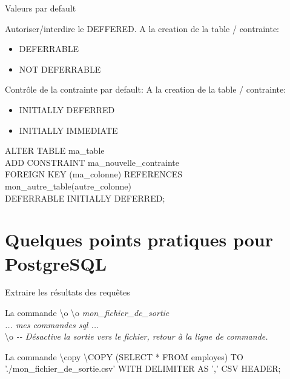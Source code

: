 \documentclass[dvipsnames]{beamer}
\begin{document}
\begin{frame}{Valeurs par default}
	\begin{block}{Autoriser/interdire le DEFFERED.}
	A la creation de la table / contrainte:
		\begin{itemize}
			\item DEFERRABLE
			\item NOT DEFERRABLE
		\end{itemize}
	\end{block}
	
	\begin{block}{Contrôle de la contrainte par default:}
	A la creation de la table / contrainte:
		\begin{itemize}
			\item INITIALLY DEFERRED
			\item INITIALLY IMMEDIATE
		\end{itemize}
	\end{block}

	\begin{alertblock}{}
{\scriptsize ALTER TABLE ma\_table\\ ADD CONSTRAINT ma\_nouvelle\_contrainte\\ FOREIGN KEY (ma\_colonne) REFERENCES mon\_autre\_table(autre\_colonne)\\ DEFERRABLE INITIALLY DEFERRED;}
	\end{alertblock}

\end{frame}

\section{Quelques points pratiques pour PostgreSQL}
\begin{frame}{Extraire les résultats des requêtes}
	\begin{block}{La commande \textbackslash o}
		\textbackslash o \textit{mon\_fichier\_de\_sortie}\\
		\textit{... mes commandes sql ...}\\
		\textbackslash o \textit{-{-} Désactive la sortie vers le fichier, retour à la ligne de commande.}
	\end{block}
	\begin{block}{La commande \textbackslash copy}
	\textbackslash COPY (SELECT * FROM employes) TO './mon\_fichier\_de\_sortie.csv' WITH DELIMITER AS ',' CSV HEADER;
	\end{block}	
\end{frame}
\end{document}
